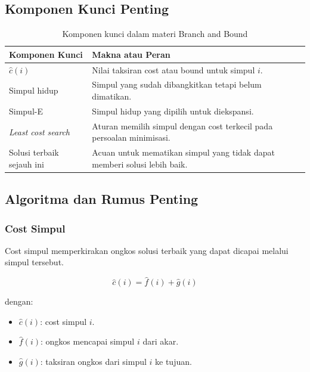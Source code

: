 \subsection{Komponen Kunci Penting}
\begin{table}[H]
\centering
\begin{tabularx}{\textwidth}{|L{0.28\textwidth}|X|}
\hline
\textbf{Komponen Kunci} & \textbf{Makna atau Peran} \\
\hline
$\hat{c}(i)$ & Nilai taksiran cost atau bound untuk simpul $i$. \\
\hline
Simpul hidup & Simpul yang sudah dibangkitkan tetapi belum dimatikan. \\
\hline
Simpul-E & Simpul hidup yang dipilih untuk diekspansi. \\
\hline
\textit{Least cost search} & Aturan memilih simpul dengan cost terkecil pada persoalan minimisasi. \\
\hline
Solusi terbaik sejauh ini & Acuan untuk mematikan simpul yang tidak dapat memberi solusi lebih baik. \\
\hline
\end{tabularx}
\caption{Komponen kunci dalam materi Branch and Bound}
\label{tab:komponen-kunci-branch-and-bound}
\end{table}

\subsection{Algoritma dan Rumus Penting}
\subsubsection{Cost Simpul}
\begin{jawab}
Cost simpul memperkirakan ongkos solusi terbaik yang dapat dicapai melalui simpul tersebut.
\end{jawab}

\begin{equation}
    \hat{c}(i)=\hat{f}(i)+\hat{g}(i)
    \label{eq:cost-bnb}
\end{equation}

dengan:
\begin{itemize}
    \item $\hat{c}(i)$: cost simpul $i$.
    \item $\hat{f}(i)$: ongkos mencapai simpul $i$ dari akar.
    \item $\hat{g}(i)$: taksiran ongkos dari simpul $i$ ke tujuan.
\end{itemize}

